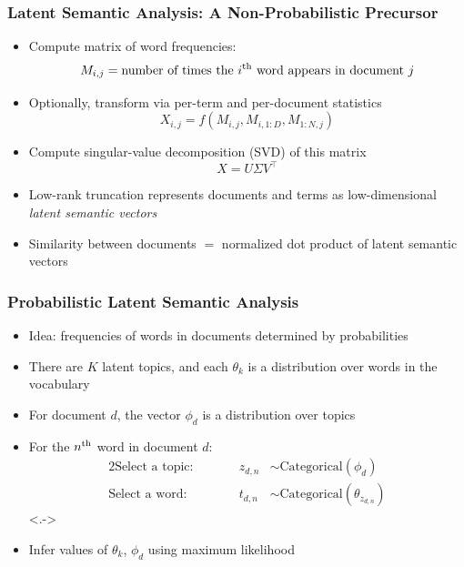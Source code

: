 \begin{frame}
\frametitle{Latent Semantic Analysis: A Non-Probabilistic Precursor}
\begin{itemize}[<+->]
\item Compute matrix of word frequencies:
\[ M_{i,j} = \text{number of times the $i^{\text{th}}$ word appears in document $j$} \]
\item Optionally, transform via per-term and per-document statistics
\[ X_{i,j} = f(M_{i,j}, M_{i,1:D}, M_{1:N,j}) \]
\item Compute singular-value decomposition (SVD) of this matrix
\[ X = U \Sigma V^\top \]
\item Low-rank truncation represents documents and terms as low-dimensional \emph{latent semantic vectors}
\item Similarity between documents $=$ normalized dot product of latent semantic vectors
\end{itemize}
\end{frame}

\begin{frame}
\frametitle{Probabilistic Latent Semantic Analysis}
\begin{itemize}[<+->]
\item Idea: frequencies of words in documents determined by probabilities
\item There are $K$ latent topics, and each $\theta_k$ is a distribution over words in the vocabulary
\item For document $d$, the vector $\phi_d$ is a distribution over topics
\item For the $n^{\text{th}}$ word in document $d$:
\begin{alignat*}{2}
\text{Select a topic:}&\qquad& z_{d,n} &\sim \text{Categorical}(\phi_d) \\
\text{Select a word:}&\qquad& t_{d,n} &\sim \text{Categorical}(\theta_{z_{d,n}})
\end{alignat*}
\onslide<.->
\begin{center}
\end{center}
\end{itemize}

\begin{itemize}[<+->]
\item Infer values of $\theta_k$, $\phi_d$ using maximum likelihood
\end{itemize}
\end{frame}

